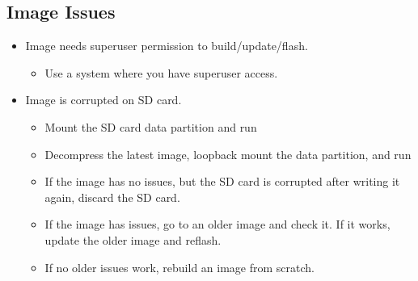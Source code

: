 \subsection{Image Issues}
\begin{itemize}
    \item Image needs superuser permission to build/update/flash.
    \begin{itemize}
        \item Use a system where you have superuser access.
    \end{itemize}
    \item Image is corrupted on SD card.
    \begin{itemize}
        \item Mount the SD card data partition and run 
        \item Decompress the latest image, loopback mount the data partition, and run 
        \item If the image has no issues, but the SD card is corrupted after writing it again, discard the SD card.
        \item If the image has issues, go to an older image and check it. If it works, update the older image and reflash.
        \item If no older issues work, rebuild an image from scratch.
    \end{itemize}
\end{itemize}